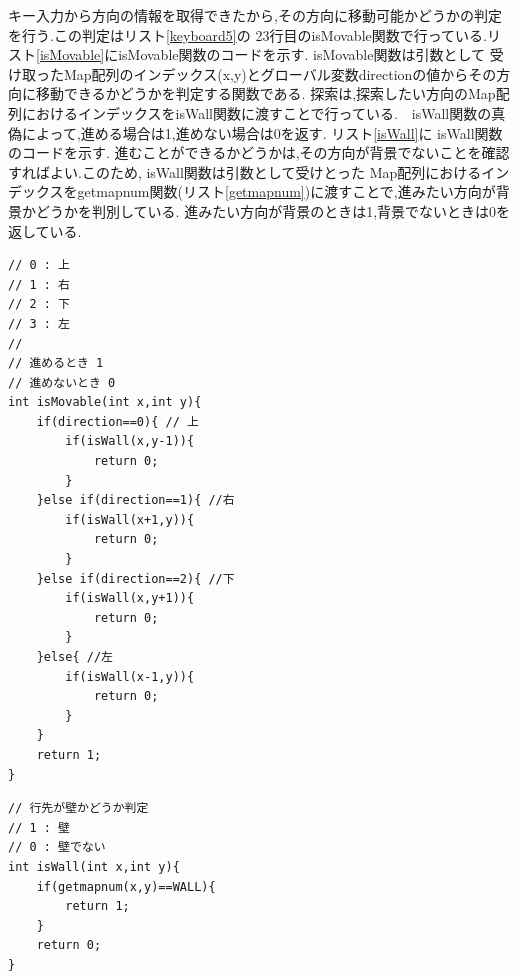 \documentclass[a4j]{jarticle}
\begin{document}
    キー入力から方向の情報を取得できたから,その方向に移動可能かどうかの判定を行う.この判定はリスト\ref{keyboard5}の
    23行目のisMovable関数で行っている.リスト\ref{isMovable}にisMovable関数のコードを示す. isMovable関数は引数として
    受け取ったMap配列のインデックス(x,y)とグローバル変数directionの値からその方向に移動できるかどうかを判定する関数である.
    探索は,探索したい方向のMap配列におけるインデックスをisWall関数に渡すことで行っている.　isWall関数の真偽によって,進める場合は1,進めない場合は0を返す. リスト\ref{isWall}に
    isWall関数のコードを示す. 進むことができるかどうかは,その方向が背景でないことを確認すればよい.このため, isWall関数は引数として受けとった
    Map配列におけるインデックスをgetmapnum関数(リスト\ref{getmapnum})に渡すことで,進みたい方向が背景かどうかを判別している. 
    進みたい方向が背景のときは1,背景でないときは0を返している.

    \begin{lstlisting}[basicstyle=\ttfamily\footnotesize, frame=single,label=isMovable,caption=isMovable関数]
// 0 : 上
// 1 : 右
// 2 : 下
// 3 : 左 
//
// 進めるとき 1
// 進めないとき 0
int isMovable(int x,int y){
    if(direction==0){ // 上
        if(isWall(x,y-1)){
            return 0;
        }
    }else if(direction==1){ //右
        if(isWall(x+1,y)){
            return 0;
        }    
    }else if(direction==2){ //下
        if(isWall(x,y+1)){
            return 0;
        }   
    }else{ //左
        if(isWall(x-1,y)){
            return 0;
        }   
    }
    return 1;
}
    \end{lstlisting}    

    \begin{lstlisting}[basicstyle=\ttfamily\footnotesize, frame=single,label=isWall,caption=isWall関数]
// 行先が壁かどうか判定
// 1 : 壁
// 0 : 壁でない
int isWall(int x,int y){
    if(getmapnum(x,y)==WALL){
        return 1;
    }
    return 0;
}
    \end{lstlisting}  
    
\end{document}
